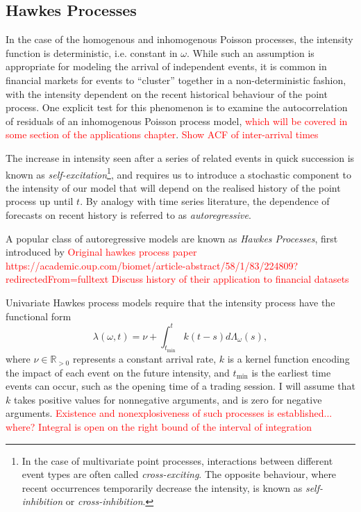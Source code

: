 \documentclass[honours,12pt]{unswthesis}
\numberwithin{equation}{section}
\begin{document}
\subsection{Hawkes Processes}
In the case of the homogenous and inhomogenous Poisson processes, the intensity function is deterministic, i.e. constant in $\omega$. While such an assumption is appropriate for modeling the arrival of independent events, it is common in financial markets for events to ``cluster'' together in a non-deterministic fashion, with the intensity dependent on the recent historical behaviour of the point process. One explicit test for this phenomenon is to examine the autocorrelation of residuals of an inhomogenous Poisson process model, \textcolor{red}{which will be covered in some section of the applications chapter}.
\textcolor{red}{Show ACF of inter-arrival times}

The increase in intensity seen after a series of related events in quick succession is known as \textit{self-excitation}\footnote{In the case of multivariate point processes, interactions between different event types are often called \textit{cross-exciting}. The opposite behaviour, where recent occurrences temporarily decrease the intensity, is known as \textit{self-inhibition} or \textit{cross-inhibition}.}, and requires us to introduce a stochastic component to the intensity of our model that will depend on the realised history of the point process up until $t$. By analogy with time series literature, the dependence of forecasts on recent history is referred to as \textit{autoregressive}.

A popular class of autoregressive models are known as \textit{Hawkes Processes}, first introduced by 
\textcolor{red}{Original hawkes process paper https://academic.oup.com/biomet/article-abstract/58/1/83/224809?redirectedFrom=fulltext}
\textcolor{red}{Discuss history of their application to financial datasets}

Univariate Hawkes process models require that the intensity process have the functional form
$$\lambda(\omega,t) = \nu + \int_{t_\mathrm{min}}^t k(t-s)d\Lambda_\omega(s),$$
where $\nu\in\mathbb{R}_{>0}$ represents a constant arrival rate, $k$ is a kernel function encoding the impact of each event on the future intensity, and $t_\mathrm{\min}$ is the earliest time events can occur, such as the opening time of a trading session. I will assume that $k$ takes positive values for nonnegative arguments, and is zero for negative arguments. \textcolor{red}{Existence and nonexplosiveness of such processes is established... where?}
\textcolor{red}{Integral is open on the right bound of the interval of integration}
\end{document}
